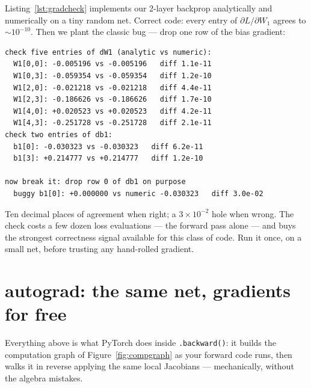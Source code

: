 \begin{example}
\label{ex:gradcheck}
Listing~\ref{lst:gradcheck} implements our 2-layer backprop analytically
and numerically on a tiny random net. Correct code: every entry of
$\partial L/\partial W_1$ agrees to $\sim10^{-10}$. Then we plant the
classic bug --- drop one row of the bias gradient:
\begin{verbatim}
check five entries of dW1 (analytic vs numeric):
  W1[0,0]: -0.005196 vs -0.005196   diff 1.1e-11
  W1[0,3]: -0.059354 vs -0.059354   diff 1.2e-10
  W1[2,0]: -0.021218 vs -0.021218   diff 4.4e-11
  W1[2,3]: -0.186626 vs -0.186626   diff 1.7e-10
  W1[4,0]: +0.020523 vs +0.020523   diff 4.2e-11
  W1[4,3]: -0.251728 vs -0.251728   diff 2.1e-11
check two entries of db1:
  b1[0]: -0.030323 vs -0.030323   diff 6.2e-11
  b1[3]: +0.214777 vs +0.214777   diff 1.2e-10

now break it: drop row 0 of db1 on purpose
  buggy b1[0]: +0.000000 vs numeric -0.030323   diff 3.0e-02
\end{verbatim}
Ten decimal places of agreement when right; a $3\times10^{-2}$ hole when
wrong. The check costs a few dozen loss evaluations --- the forward pass
alone --- and buys the strongest correctness signal available for this
class of code. Run it once, on a small net, before trusting any hand-rolled
gradient.
\end{example}



\section{autograd: the same net, gradients for free}
\label{sec:autograd}

Everything above is what PyTorch does inside \texttt{.backward()}: it
builds the computation graph of Figure~\ref{fig:compgraph} as your
forward code runs, then walks it in reverse applying the same local
Jacobians --- mechanically, without the algebra mistakes.



